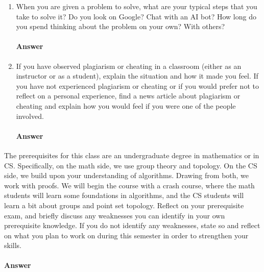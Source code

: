 \documentclass{article}
\begin{document}

\begin{enumerate}
    \item When you are given a problem to solve, what are your typical steps
        that you take to solve it?   Do you look on Google? Chat with an AI bot?
        How long do you spend thinking about the problem on your own? With
        others?
        \paragraph{Answer}
        \todo{}



    \item If you have observed plagiarism or cheating in a classroom (either as
        an instructor or as a student), explain the situation and how it made
        you feel.  If you have not experienced plagiarism or cheating or if you
        would prefer not to reflect on a personal experience, find a news
        article about plagiarism or cheating and explain how you would feel if
        you were one of the people involved.

        \paragraph{Answer}
        \todo{}
\end{enumerate}



The prerequisites for this class are an undergraduate degree in mathematics or
in CS.  Specifically, on the math side, we use group theory and topology. On the
CS side, we build upon your understanding of algorithms. Drawing from both, we
work with proofs.
We will begin the course with a crash course, where the math students will learn
some foundations in algorithms, and the CS students will learn a bit about
groups and point set topology.
Reflect on your prerequisite exam, and briefly discuss any
weaknesses you can identify in your own prerequisite knowledge. If you do not
identify any weaknesses, state so and reflect on what you plan to work on during
this semester in order to strengthen your skills.

\paragraph{Answer}

\todo{}
\end{document}
